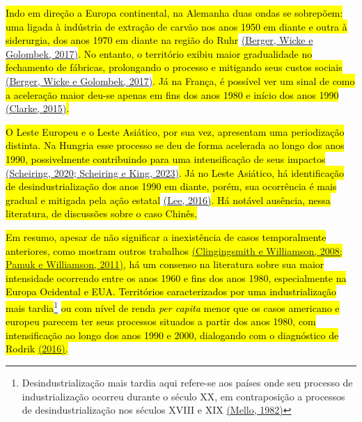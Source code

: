 \hl{Indo em direção a Europa continental, na Alemanha duas ondas se
sobrepõem: uma ligada à indústria de extração de carvão nos anos 1950 em
diante e outra à siderurgia, dos anos 1970 em diante na região do Ruhr}
\href{https://www.zotero.org/google-docs/?h9qam5}{(Berger, Wicke e
Golombek, 2017)}\hl{. No entanto, o território exibiu maior gradualidade
no fechamento de fábricas, prolongando o processo e mitigando seus
custos sociais}
\href{https://www.zotero.org/google-docs/?MVk663}{(Berger, Wicke e
Golombek, 2017)}\hl{. Já na França, é possível ver um sinal de como a
aceleração maior deu-se apenas em fins dos anos 1980 e início dos anos
1990} \href{https://www.zotero.org/google-docs/?CGshOg}{(Clarke,
2015)}\hl{.}

\hl{O Leste Europeu e o Leste Asiático, por sua vez, apresentam uma
periodização distinta. Na Hungria esse processo se deu de forma
acelerada ao longo dos anos 1990, possivelmente contribuindo para uma
intensificação de seus impactos}
\href{https://www.zotero.org/google-docs/?O6VLTx}{(Scheiring, 2020;
Scheiring e King, 2023)}\hl{. Já no Leste Asiático, há identificação de
desindustrialização dos anos 1990 em diante, porém, sua ocorrência é
mais gradual e mitigada pela ação estatal}
\href{https://www.zotero.org/google-docs/?8gOF1N}{(Lee, 2016)}\hl{. Há
notável ausência, nessa literatura, de discussões sobre o caso Chinês.}

\hl{Em resumo, apesar de não significar a inexistência de casos
temporalmente anteriores, como mostram outros trabalhos
\href{https://www.zotero.org/google-docs/?fMnUVP}{(Clingingsmith e
Williamson, 2008; Pamuk e Williamson, 2011)}, há um consenso na
literatura sobre sua maior intensidade ocorrendo entre os anos 1960 e
fins dos anos 1980, especialmente na Europa Ocidental e EUA. Territórios
caracterizados por uma industrialização mais tardia}\footnote{Desindustrialização
  mais tardia aqui refere-se aos países onde seu processo de
  industrialização ocorreu durante o século XX, em contraposição a
  processos de desindustrialização nos séculos XVIII e XIX
  \href{https://www.zotero.org/google-docs/?MTwFmM}{(Mello, 1982)}}
\hl{ou com nível de renda \emph{per capita} menor que os casos americano
e europeu parecem ter seus processos situados a partir dos anos 1980,
com intensificação ao longo dos anos 1990 e 2000, dialogando com o
diagnóstico de Rodrik
\href{https://www.zotero.org/google-docs/?YSyJ0m}{(2016)}.}

